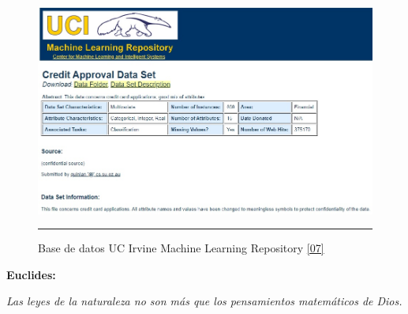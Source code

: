 \documentclass[11pt,titlepage]{report}
\begin{document}
\begin{figure}[h]
	\centering
	\includegraphics[scale=0.6]{Pic/Web_DB}
	\caption{Base de datos UC Irvine Machine Learning Repository \ref{07}}
	\hrule
\end{figure}


\newpage
\thispagestyle{empty}
\vspace*{8cm}
\textbf{Euclides:\\}
\begin{center}
\textit{Las leyes de la naturaleza no son más que los pensamientos matemáticos de Dios.}
\end{center}


\end{document}
